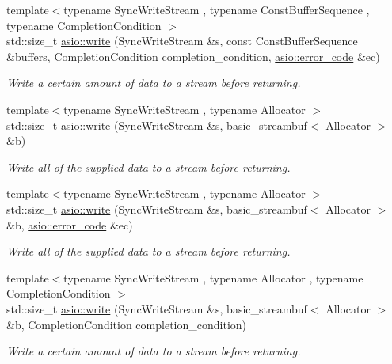 \begin{DoxyCompactItemize}
{\footnotesize template$<$typename Sync\+Write\+Stream , typename Const\+Buffer\+Sequence , typename Completion\+Condition $>$ }\\std\+::size\+\_\+t \hyperlink{group__write_gaf53a6638aac728c8bf61621b12fa8fce}{asio\+::write} (Sync\+Write\+Stream \&s, const Const\+Buffer\+Sequence \&buffers, Completion\+Condition completion\+\_\+condition, \hyperlink{classasio_1_1error__code}{asio\+::error\+\_\+code} \&ec)
\begin{DoxyCompactList}\small\item\em Write a certain amount of data to a stream before returning. \end{DoxyCompactList}\item 
{\footnotesize template$<$typename Sync\+Write\+Stream , typename Allocator $>$ }\\std\+::size\+\_\+t \hyperlink{group__write_ga85807d13da87adf48b62979f65f41152}{asio\+::write} (Sync\+Write\+Stream \&s, basic\+\_\+streambuf$<$ Allocator $>$ \&b)
\begin{DoxyCompactList}\small\item\em Write all of the supplied data to a stream before returning. \end{DoxyCompactList}\item 
{\footnotesize template$<$typename Sync\+Write\+Stream , typename Allocator $>$ }\\std\+::size\+\_\+t \hyperlink{group__write_gaf72f7eddd7d4629ea2e2b7f5b7f355bc}{asio\+::write} (Sync\+Write\+Stream \&s, basic\+\_\+streambuf$<$ Allocator $>$ \&b, \hyperlink{classasio_1_1error__code}{asio\+::error\+\_\+code} \&ec)
\begin{DoxyCompactList}\small\item\em Write all of the supplied data to a stream before returning. \end{DoxyCompactList}\item 
{\footnotesize template$<$typename Sync\+Write\+Stream , typename Allocator , typename Completion\+Condition $>$ }\\std\+::size\+\_\+t \hyperlink{group__write_gaa80988391fb309ee53cc557d0065550a}{asio\+::write} (Sync\+Write\+Stream \&s, basic\+\_\+streambuf$<$ Allocator $>$ \&b, Completion\+Condition completion\+\_\+condition)
\begin{DoxyCompactList}\small\item\em Write a certain amount of data to a stream before returning. \end{DoxyCompactList}\item 

\end{DoxyCompactItemize}
